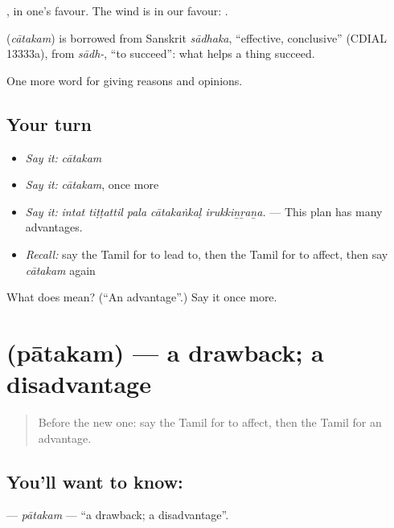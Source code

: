 , in one's favour. The wind is in our favour:    .

\begin{cousinweb}
\textbf{} (\emph{cātakam}) is borrowed from Sanskrit \emph{sādhaka}, \textquotedblleft{}effective, conclusive\textquotedblright{} (CDIAL 13333a), from \emph{sādh-}, \textquotedblleft{}to succeed\textquotedblright{}: what helps a thing succeed.
\end{cousinweb}

\begin{grammarlens}[title={What you've built}]
One more word for giving reasons and opinions.
\end{grammarlens}

\subsection*{Your turn}
\begin{itemize}
\raggedright
  \item \emph{Say it:} \emph{cātakam}
  \item \emph{Say it:} \emph{cātakam}, once more
  \item \emph{Say it:} \emph{intat tiṭṭattil pala cātakaṅkaḷ irukkiṉṟaṉa.} — This plan has many advantages.
  \item \emph{Recall:} say the Tamil for to lead to, then the Tamil for to affect, then say \emph{cātakam} again
\end{itemize}

\begin{tcolorbox}[breakable,colback=teal!4,colframe=teal!35!black,title={Before you move on}]
What does  mean? (\textquotedblleft{}An advantage\textquotedblright{}.) Say it once more.
\end{tcolorbox}
\section[\texorpdfstring{\ta{பாதகம்} (pātakam)}{பாதகம் (pātakam)}]{ (pātakam) — a drawback; a disadvantage}

\label{lesson:TA-C353-patakam}



\begin{quote}
Before the new one: say the Tamil for to affect, then the Tamil for an advantage.
\end{quote}

\subsection*{You'll want to know: }
\textbf{} — \emph{pātakam} — \textquotedblleft{}a drawback; a disadvantage\textquotedblright{}.

